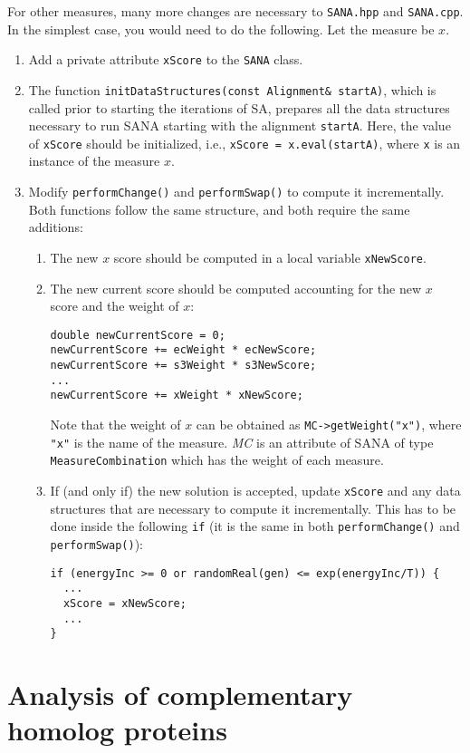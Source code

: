 \documentclass[]{article}
\begin{document}
For other measures, many more changes are necessary to \texttt{SANA.hpp} and \texttt{SANA.cpp}. In the simplest case, you would need to do the following. Let the measure be $x$.
\begin{enumerate}
\item Add a private attribute \texttt{xScore} to the \texttt{SANA} class.
\item The function \texttt{initDataStructures(const Alignment\& startA)}, which is called prior to starting the iterations of SA, prepares all the data structures necessary to run SANA starting with the alignment \texttt{startA}. Here, the value of \texttt{xScore} should be initialized, i.e., \texttt{xScore = x.eval(startA)}, where \texttt{x} is an instance of the measure $x$.
\item Modify \texttt{performChange()} and \texttt{performSwap()} to compute it incrementally. Both functions follow the same structure, and both require the same additions:
\begin{enumerate}
\item The new $x$ score should be computed in a local variable \texttt{xNewScore}.
\item The new current score should be computed accounting for the new $x$ score and the weight of $x$:
\begin{verbatim}
double newCurrentScore = 0;
newCurrentScore += ecWeight * ecNewScore;
newCurrentScore += s3Weight * s3NewScore;
...
newCurrentScore += xWeight * xNewScore;
\end{verbatim}
Note that the weight of $x$ can be obtained as \texttt{MC->getWeight("x")}, where \texttt{"x"} is the name of the measure. \emph{MC} is an attribute of SANA of type \texttt{MeasureCombination} which has the weight of each measure.
\item If (and only if) the new solution is accepted, update \texttt{xScore} and any data structures that are necessary to compute it incrementally. This has to be done inside the following \texttt{if} (it is the same in both \texttt{performChange()} and \texttt{performSwap()}):
\begin{verbatim}
if (energyInc >= 0 or randomReal(gen) <= exp(energyInc/T)) {
  ...
  xScore = xNewScore;
  ...
}
\end{verbatim}
\end{enumerate}
\end{enumerate}


\section{Analysis of complementary homolog proteins}
\end{document}

